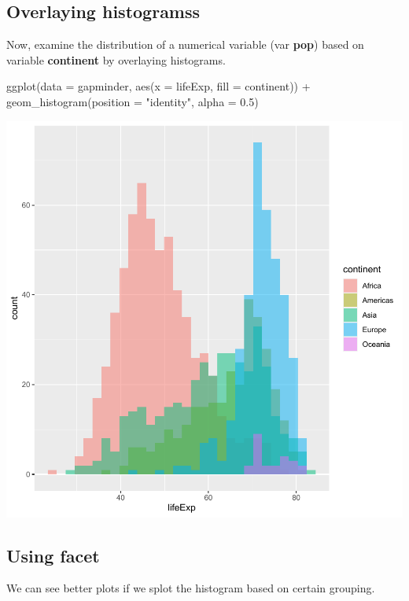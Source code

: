 \documentclass[
]{book}
\makeatletter
\newenvironment{Shaded}{\begin{snugshade}}{\end{snugshade}}
\newcommand{\AttributeTok}[1]{\textcolor[rgb]{0.61,0.61,0.61}{#1}}
\newcommand{\FloatTok}[1]{\textcolor[rgb]{0.06,0.06,0.06}{#1}}
\newcommand{\FunctionTok}[1]{\textcolor[rgb]{0,0,0}{#1}}
\newcommand{\NormalTok}[1]{#1}
\newcommand{\SpecialCharTok}[1]{\textcolor[rgb]{0,0,0}{#1}}
\newcommand{\StringTok}[1]{\textcolor[rgb]{0.5,0.5,0.5}{#1}}
\newenvironment{kframe}{%
\medskip{}
\setlength{\fboxsep}{.8em}
 \def\at@end@of@kframe{}%
 \ifinner\ifhmode%
  \def\at@end@of@kframe{\end{minipage}}%
  \begin{minipage}{\columnwidth}%
 \fi\fi%
 \def\FrameCommand##1{\hskip\@totalleftmargin \hskip-\fboxsep
 \colorbox{shadecolor}{##1}\hskip-\fboxsep
     \hskip-\linewidth \hskip-\@totalleftmargin \hskip\columnwidth}%
 \MakeFramed {\advance\hsize-\width
   \@totalleftmargin\z@ \linewidth\hsize
   \@setminipage}}%
 {\par\unskip\endMakeFramed%
 \at@end@of@kframe}
\renewenvironment{Shaded}{\begin{kframe}}{\end{kframe}}
\makeatother
\begin{document}
\hypertarget{overlaying-histogramss}{%
\subsection{Overlaying histogramss}\label{overlaying-histogramss}}

Now, examine the distribution of a numerical variable (var \textbf{pop}) based on variable \textbf{continent} by overlaying histograms.

\begin{Shaded}
\begin{Highlighting}[]
\FunctionTok{ggplot}\NormalTok{(}\AttributeTok{data =}\NormalTok{ gapminder, }\FunctionTok{aes}\NormalTok{(}\AttributeTok{x =}\NormalTok{ lifeExp, }\AttributeTok{fill =}\NormalTok{ continent)) }\SpecialCharTok{+}
    \FunctionTok{geom\_histogram}\NormalTok{(}\AttributeTok{position =} \StringTok{"identity"}\NormalTok{, }\AttributeTok{alpha =} \FloatTok{0.5}\NormalTok{)}
\end{Highlighting}
\end{Shaded}

\begin{center}\includegraphics[width=0.7\linewidth,keepaspectratio]{Multivariable_Data_Analysis_files/figure-latex/unnamed-chunk-81-1} \end{center}

\hypertarget{using-facet}{%
\subsection{Using facet}\label{using-facet}}

We can see better plots if we splot the histogram based on certain grouping.
\end{document}
